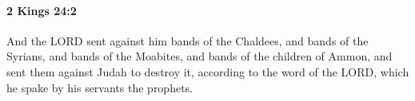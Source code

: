 
		\paragraph{2 Kings 24:2} %
			\label{2KINGS-24-2}

			And the LORD sent against him bands of the Chaldees, and bands of the Syrians, and bands of the Moabites, and bands of the children of Ammon, and sent them against Judah to destroy it, according to the word of the LORD, which he spake by his servants the prophets.


